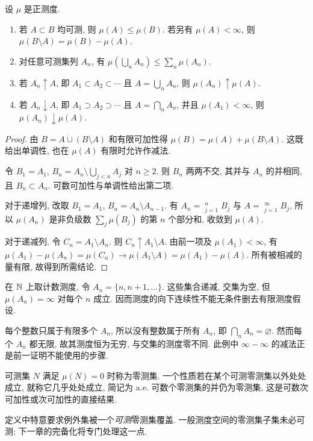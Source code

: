 \begin{proposition}\label{ra:c1:measure-properties}
设 $\mu$ 是正测度.
\begin{enumerate}
\item 若 $A\subset B$ 均可测, 则 $\mu(A)\le\mu(B)$. 若另有 $\mu(A)<\infty$, 则 $\mu(B\setminus A)=\mu(B)-\mu(A)$.
\item 对任意可测集列 $A_n$, 有 $\mu(\bigcup_n A_n)\le\sum_n\mu(A_n)$.
\item 若 $A_n\uparrow A$, 即 $A_1\subset A_2\subset\cdots$ 且 $A=\bigcup_n A_n$, 则 $\mu(A_n)\uparrow\mu(A)$.
\item 若 $A_n\downarrow A$, 即 $A_1\supset A_2\supset\cdots$ 且 $A=\bigcap_n A_n$, 并且 $\mu(A_1)<\infty$, 则 $\mu(A_n)\downarrow\mu(A)$.
\end{enumerate}
\end{proposition}
\begin{proof}
由 $B=A\mathbin{\dot\cup}(B\setminus A)$ 和有限可加性得 $\mu(B)=\mu(A)+\mu(B\setminus A)$. 这既给出单调性, 也在 $\mu(A)$ 有限时允许作减法.

令 $B_1=A_1$, $B_n=A_n\setminus\bigcup_{j<n}A_j$ 对 $n\ge2$. 则 $B_n$ 两两不交, 其并与 $A_n$ 的并相同, 且 $B_n\subset A_n$. 可数可加性与单调性给出第二项.

对于递增列, 改取 $B_1=A_1$, $B_n=A_n\setminus A_{n-1}$. 有 $A_n=\mathop{\dot\bigcup}_{j=1}^{n}B_j$ 与 $A=\mathop{\dot\bigcup}_{j=1}^{\infty}B_j$, 所以 $\mu(A_n)$ 是非负级数 $\sum_j\mu(B_j)$ 的第 $n$ 个部分和, 收敛到 $\mu(A)$.

对于递减列, 令 $C_n=A_1\setminus A_n$. 则 $C_n\uparrow A_1\setminus A$. 由前一项及 $\mu(A_1)<\infty$, 有 $\mu(A_1)-\mu(A_n)=\mu(C_n)\to\mu(A_1\setminus A)=\mu(A_1)-\mu(A)$. 所有被相减的量有限, 故得到所需结论.
\end{proof}

\begin{example}
在 $\mathbb N$ 上取计数测度, 令 $A_n=\{n,n+1,\ldots\}$. 这些集合递减, 交集为空, 但 $\mu(A_n)=\infty$ 对每个 $n$ 成立. 因而测度的向下连续性不能无条件删去有限测度假设.
\end{example}
\begin{solution}
每个整数只属于有限多个 $A_n$, 所以没有整数属于所有 $A_n$, 即 $\bigcap_n A_n=\varnothing$. 然而每个 $A_n$ 都无限, 故其测度恒为无穷, 与交集的测度零不同. 此例中 $\infty-\infty$ 的减法正是前一证明不能使用的步骤.
\end{solution}

\begin{definition}
可测集 $N$ 满足 $\mu(N)=0$ 时称为零测集. 一个性质若在某个可测零测集以外处处成立, 就称它几乎处处成立, 简记为 a.e. 可数个零测集的并仍为零测集, 这是可数次可加性或次可加性的直接结果.
\end{definition}
定义中特意要求例外集被一个\emph{可测}零测集覆盖. 一般测度空间的零测集子集未必可测; 下一章的完备化将专门处理这一点.

